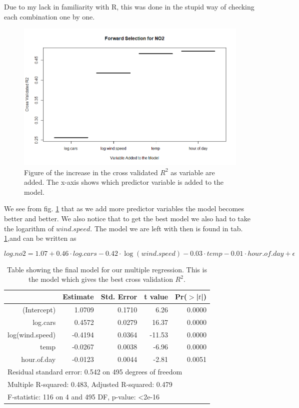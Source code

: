 \documentclass[a4paper,norsk, 10pt]{article}
\begin{document}
Due to my lack in familiarity with R, this was done in the stupid way of checking each combination one by one. 


\begin{figure}[!htbp]
\centering
\includegraphics[scale=0.5]{r2_forward.png}
\caption{Figure of the increase in the cross validated $R^2$ as variable are added. The x-axis shows which predictor variable is added to the model.}\label{fig:r2}
\end{figure}


We see from fig. \ref{fig:r2} that as we add more predictor variables the model becomes better and better. We also notice that to get the best model we also had to take the logarithm of $wind.speed$. The model we are left with then is found in tab. \ref{tab:r2},and can be written as

\begin{equation}\label{eq:full}
log.no2 = 1.07 + 0.46\cdot log.cars - 0.42\cdot \log(wind.speed) - 0.03\cdot temp - 0.01 \cdot hour.of.day + \epsilon
\end{equation}

\begin{table}[ht]
\centering
\begin{tabular}{rrrrr}
  \hline
 & Estimate & Std. Error & t value & Pr($>$|$t$|) \\ 
  \hline
(Intercept) & 1.0709 & 0.1710 & 6.26 & 0.0000 \\ 
  log.cars & 0.4572 & 0.0279 & 16.37 & 0.0000 \\ 
  log(wind.speed) & -0.4194 & 0.0364 & -11.53 & 0.0000 \\ 
  temp & -0.0267 & 0.0038 & -6.96 & 0.0000 \\ 
  hour.of.day & -0.0123 & 0.0044 & -2.81 & 0.0051 \\ 
   \hline
      \multicolumn{5}{l}{Residual standard error: 0.542 on 495 degrees of freedom} \\
   \multicolumn{5}{l}{Multiple R-squared:  0.483,	Adjusted R-squared:  0.479 } \\
   \multicolumn{5}{l}{F-statistic:  116 on 4 and 495 DF,  p-value: <2e-16} \\ \hline
\end{tabular}
\caption{Table showing the final model for our multiple regression. This is the model which gives the best cross validation $R^2$.}\label{tab:r2}
\end{table}
\end{document}
